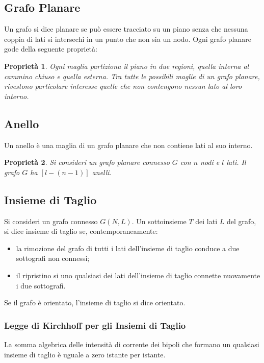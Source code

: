 \documentclass[a4paper]{report}
\newtheorem{prop}{Propriet\`a}
\begin{document}
\subsection{Grafo Planare}

Un grafo si dice planare se pu\`o essere tracciato su un piano senza
che nessuna coppia di lati si intersechi in un punto che non sia un
nodo.
Ogni grafo planare gode della seguente propriet\`a:

\begin{prop}
Ogni maglia partiziona il piano in due regioni, quella interna al
cammino chiuso e quella esterna. Tra tutte le possibili maglie di un
grafo planare, rivestono particolare interesse quelle che non
contengono nessun lato al loro interno.  
\end{prop}

\subsection{Anello}

Un anello \`e una maglia di un grafo planare che non contiene lati al
suo interno.

\begin{prop}
  Si consideri un grafo planare connesso $G$ con $n$ nodi e $l$
  lati. Il grafo $G$ ha $[l-(n-1)]$ anelli.
\end{prop}
\subsection{Insieme di Taglio}
Si consideri un grafo connesso $G(N, L)$. Un sottoinsieme $T$ dei lati
$L$ del grafo, si dice insieme di taglio se, contemporaneamente:
\begin{itemize}
\item la rimozione del grafo di tutti i lati dell'insieme di taglio
  conduce a due sottografi non connessi;
\item il ripristino si uno qualsiasi dei lati dell'insieme di taglio
  connette nuovamente i due sottografi.
\end{itemize}
Se il grafo \`e orientato, l'insieme di taglio si dice orientato.

\subsubsection{Legge di Kirchhoff per gli Insiemi di Taglio}
  La somma algebrica delle intensit\`a di corrente dei bipoli che
  formano un qualsiasi insieme di taglio \`e uguale a zero istante per
  istante.
\end{document}
